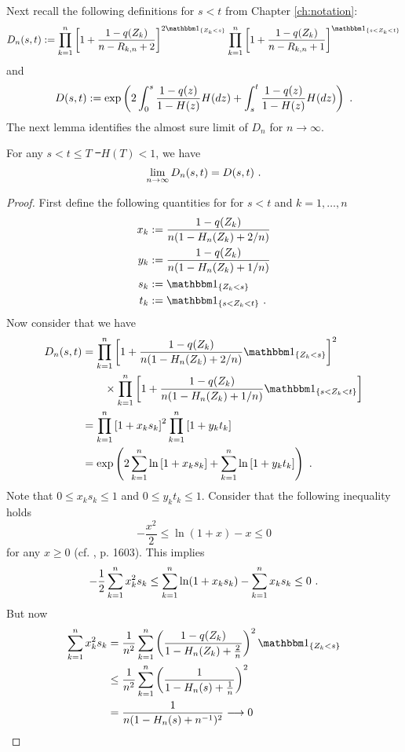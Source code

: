 %
Next recall the following definitions for $s<t$ from Chapter \ref{ch:notation}:
$$D_n(s,t) := \prod_{k=1}^{n} \left[1+\frac{1-q(Z_k)}{n-R_{k,n} +2}\right]^{2\I{Z_k<s}} \prod_{k=1}^{n}\left[1+\frac{1-q(Z_k)}{n-R_ {k,n}+1}\right]^{\I{s < Z_k < t}}$$
and 
$$D(s,t) := \exp\left(2\int_{0}^{s} \frac{1-q(z)}{1-H(z)} H(dz) + \int_{s}^{t} \frac{1-q(z)}{1-H(z)} H(dz)\right)\textrm{ .}$$
The next lemma identifies the almost sure limit of $D_n$ for $n\to\infty$. 
%
\begin{lemma} \label{lem:dn_limit}
	For any $s < t \leq T$ \st\ $H(T)<1$, we have
	$$\lim\limits_{n\to\infty}D_n(s,t) = D(s,t)\textrm{ .}$$
	\begin{proof}
		First define the following quantities for for $s<t$ and $k=1,\dots,n$
		\begin{align*}
		x_k &:= \frac{1-q(Z_k)}{n(1- H_n(Z_k) + 2/n)}\\
		y_k &:= \frac{1-q(Z_k)}{n(1- H_n(Z_k) + 1/n)}\\
		s_k &:= \I{Z_k < s} \\
		t_k &:= \I{s < Z_k < t}\mdot
		\end{align*}
		Now consider that we have
		\begin{align*}
		D_n(s,t) &= \prod_{k=1}^{n} \left[1+\frac{1-q(Z_k)}{n(1- H_n(Z_k) + 2/n)}\I{Z_k<s}\right]^{2}\\ 
		&\qquad \times \prod_{k=1}^{n}\left[1+\frac{1-q(Z_k)}{n(1-H_n(Z_k)+1/n)}\I{s < Z_k < t}\right]\\
		&= \prod_{k=1}^{n} \left[1+x_k s_k\right]^{2} \prod_{k=1}^{n}\left[1+y_k t_k\right]\\
		&= \exp\left(2\sum_{k=1}^{n}\ln\left[1+x_k s_k\right] + \sum_{k=1}^{n}\ln\left[1+y_k t_k\right]\right)\mdot
		\end{align*}
		Note that $0 \leq x_k s_k \leq 1$ and $0 \leq y_k t_k \leq 1$. Consider that the following inequality holds  
		$$-\frac{x^2}{2} \leq \ln(1+x) - x \leq 0$$ 
		for any $x \geq 0$ (cf.  \cite{stute1993strong}, p. 1603). This implies 
		$$-\frac{1}{2}\sum_{k=1}^{n}x_k^2 s_k \leq \sum_{k=1}^{n}\ln(1+x_k s_k) - \sum_{k=1}^{n}x_k s_k \leq 0\textrm{ .}$$ 
		But now 
		\begin{align*}
		\sum_{k=1}^{n} x_k^2 s_k &= \frac{1}{n^2} \sum_{k=1}^{n} \left(\frac{1-q(Z_k)}{1-H_n(Z_k)+\frac{2}{n}}\right)^2\I{Z_k<s}\\
		&\leq \frac{1}{n^2} \sum_{k=1}^{n} \left(\frac{1}{1-H_n(s)+\frac{1}{n}}\right)^2\\
		&= \frac{1}{n(1-H_n(s)+n^{-1})^2} \longrightarrow 0
		\end{align*}

\end{proof}
\end{lemma}
